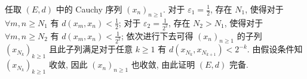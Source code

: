 \begin{enumerate}
\begin{answer}[]
      任取 $(E,d)$ 中的 Cauchy 序列 $(x_n)_{n\geq 1}$.
      对于 $\varepsilon_1=\frac{1}{2}$, 存在 $N_1$, 使得对于 $\forall m,n\geq N_1$
      有 $d(x_m,x_n)<\frac{1}{2}$;
      对于 $\varepsilon_2=\frac{1}{2^2}$, 存在 $N_2>N_1$, 使得对于 $\forall m,n\geq N_2$
      有 $d(x_m,x_n)<\frac{1}{2^2}$;
      依次进行下去可得 $(x_n)_{n\geq 1}$ 的子列 $(x_{N_k})_{k\geq 1}$
      且此子列满足对于任意 $k\geq 1$ 有 $d(x_{N_k},x_{N_{k+1}})<2^{-k}$.
      由假设条件知 $(x_{N_k})_{k\geq 1}$ 收敛, 因此 $(x_n)_{n\geq 1}$ 也收敛,
      由此证明 $(E,d)$ 完备.
    \end{answer}


\end{enumerate}
